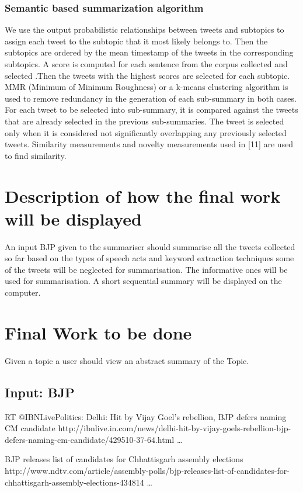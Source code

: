 \documentclass[conference]{IEEEtran}
\begin{document}
\subsubsection{\textbf{Semantic based summarization algorithm}}
\par We use the output probabilistic relationships between tweets and subtopics to assign each tweet to the subtopic that it most likely belongs to. Then the subtopics are ordered by the mean timestamp of the tweets in the corresponding subtopics. A score is computed for each sentence from the corpus collected and selected .Then the tweets with the highest scores are selected for each subtopic. MMR (Minimum of Minimum Roughness) or a k-means clustering algorithm is used to remove redundancy in the generation of each sub-summary in both cases. For each tweet to be selected into sub-summary, it is compared against the tweets that are already selected in the previous sub-summaries. The tweet is selected only when it is considered not significantly overlapping any previously selected tweets.  Similarity measurements and novelty measurements used in [11] are used to find similarity.

\section{\textbf{Description of how the final work will be displayed}}
\par An input BJP given to the summariser should summarise all the tweets collected so far based on the types of speech acts and keyword extraction techniques some of the tweets will be neglected for summarisation. The informative ones will be used for summarisation. A short sequential summary will be displayed on the computer.

\section{\textbf{Final Work to be done}}
Given a topic a user should view an abstract summary of the Topic.

\subsection{\textbf{Input:} BJP}
RT @IBNLivePolitics: Delhi: Hit by Vijay Goel's rebellion, BJP defers naming CM candidate http://ibnlive.in.com/news/delhi-hit-by-vijay-goels-rebellion-bjp-defers-naming-cm-candidate/429510-37-64.html …

BJP releases list of candidates for Chhattisgarh assembly elections http://www.ndtv.com/article/assembly-polls/bjp-releases-list-of-candidates-for-chhattisgarh-assembly-elections-434814 …
\end{document}

